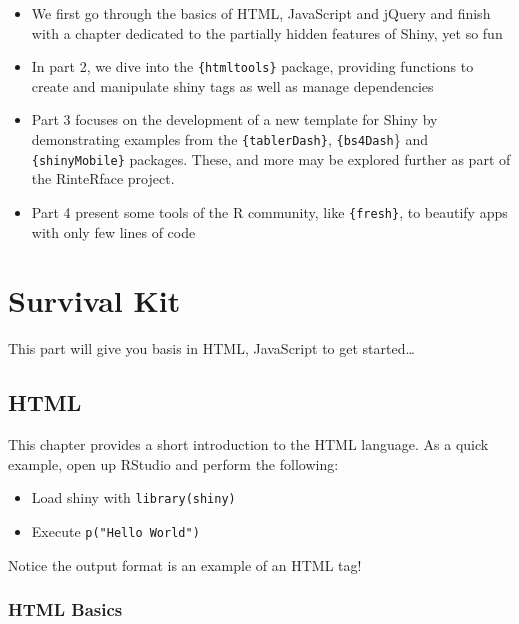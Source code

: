 \documentclass[]{book}
\providecommand{\tightlist}{%
  \setlength{\itemsep}{0pt}\setlength{\parskip}{0pt}}
\begin{document}
\begin{itemize}
\tightlist
\item
  We first go through the basics of HTML, JavaScript and jQuery and finish with a chapter dedicated to the partially hidden features of Shiny, yet so fun
\item
  In part 2, we dive into the \texttt{\{htmltools\}} package, providing functions to create and manipulate shiny tags as well as manage dependencies
\item
  Part 3 focuses on the development of a new template for Shiny by demonstrating examples from the \texttt{\{tablerDash\}}, \texttt{\{bs4Dash}\} and \texttt{\{shinyMobile\}} packages. These, and more may be explored further as part of the RinteRface project.
\item
  Part 4 present some tools of the R community, like \texttt{\{fresh\}}, to beautify apps with only few lines of code
\end{itemize}

\hypertarget{part-survival-kit}{%
\part*{Survival Kit}\label{part-survival-kit}}

This part will give you basis in HTML, JavaScript to get started\ldots{}

\hypertarget{survival-kit-html}{%
\chapter{HTML}\label{survival-kit-html}}

This chapter provides a short introduction to the HTML language. As a quick example, open up RStudio and perform the following:

\begin{itemize}
\tightlist
\item
  Load shiny with \texttt{library(shiny)}
\item
  Execute \texttt{p("Hello\ World")}
\end{itemize}

Notice the output format is an example of an HTML tag!

\hypertarget{html-basics}{%
\section{HTML Basics}\label{html-basics}}
\end{document}
